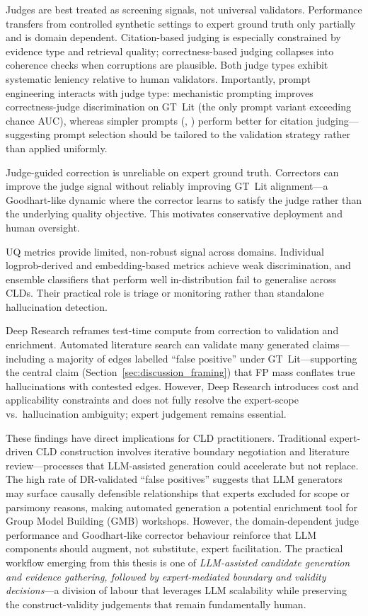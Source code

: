 Judges are best treated as screening signals, not universal validators. Performance transfers from controlled synthetic settings to expert ground truth only partially and is domain dependent. Citation-based judging is especially constrained by evidence type and retrieval quality; correctness-based judging collapses into coherence checks when corruptions are plausible. Both judge types exhibit systematic leniency relative to human validators. Importantly, prompt engineering interacts with judge type: mechanistic prompting improves correctness-judge discrimination on GT~Lit (the only prompt variant exceeding chance AUC), whereas simpler prompts (\PromptBaseline{}, \PromptCoT{}) perform better for citation judging---suggesting prompt selection should be tailored to the validation strategy rather than applied uniformly.

Judge-guided correction is unreliable on expert ground truth. Correctors can improve the judge signal without reliably improving GT~Lit alignment---a Goodhart-like dynamic where the corrector learns to satisfy the judge rather than the underlying quality objective. This motivates conservative deployment and human oversight.

UQ metrics provide limited, non-robust signal across domains. Individual logprob-derived and embedding-based metrics achieve weak discrimination, and ensemble classifiers that perform well in-distribution fail to generalise across CLDs. Their practical role is triage or monitoring rather than standalone hallucination detection.

Deep Research reframes test-time compute from correction to validation and enrichment. Automated literature search can validate many generated claims---including a majority of edges labelled ``false positive'' under GT~Lit---supporting the central claim (Section~\ref{sec:discussion_framing}) that FP mass conflates true hallucinations with contested edges. However, Deep Research introduces cost and applicability constraints and does not fully resolve the expert-scope vs.\ hallucination ambiguity; expert judgement remains essential.

These findings have direct implications for CLD practitioners. Traditional expert-driven CLD construction involves iterative boundary negotiation and literature review---processes that LLM-assisted generation could accelerate but not replace. The high rate of DR-validated ``false positives'' suggests that LLM generators may surface causally defensible relationships that experts excluded for scope or parsimony reasons, making automated generation a potential enrichment tool for Group Model Building (GMB) workshops. However, the domain-dependent judge performance and Goodhart-like corrector behaviour reinforce that LLM components should augment, not substitute, expert facilitation. The practical workflow emerging from this thesis is one of \emph{LLM-assisted candidate generation and evidence gathering, followed by expert-mediated boundary and validity decisions}---a division of labour that leverages LLM scalability while preserving the construct-validity judgements that remain fundamentally human.

